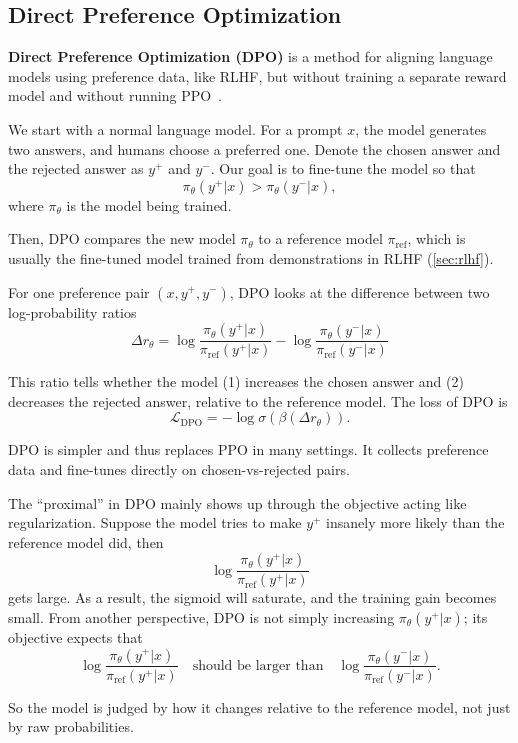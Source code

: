 \subsection{Direct Preference Optimization}

\textbf{Direct Preference Optimization (DPO)} is a method for aligning language models using preference data, like RLHF, but without training a separate reward model and without running PPO~\cite{rafailov2023direct}.

We start with a normal language model. For a prompt \(x\), the model generates two answers, and humans choose a preferred one. Denote the chosen answer and the rejected answer as \(y^+\) and \(y^-\). Our goal is to fine-tune the model so that
\[
	\pi_\theta (y^+ | x) > \pi_\theta (y^- | x),
\]
where \(\pi_\theta\) is the model being trained.

Then, DPO compares the new model \(\pi_\theta\) to a reference model \(\pi_\text{ref}\), which is usually the fine-tuned model trained from demonstrations in RLHF (\ref{sec:rlhf}).

For one preference pair \((x, y^+, y^-)\), DPO looks at the difference between two log-probability ratios
\[
	\Delta r_\theta =
	\log\frac{\pi_\theta(y^+|x)}{\pi_\text{ref}(y^+|x)} -
	\log\frac{\pi_\theta(y^-|x)}{\pi_\text{ref}(y^-|x)}
\]

This ratio tells whether the model (1) increases the chosen answer and (2) decreases the rejected answer, relative to the reference model. The loss of DPO is
\begin{equation}
	\mathcal{L}_\text{DPO} = - \log \sigma \left( \beta (\Delta r_\theta) \right).
\end{equation}

DPO is simpler and thus replaces PPO in many settings. It collects preference data and fine-tunes directly on chosen-vs-rejected pairs.

The “proximal” in DPO mainly shows up through the objective acting like regularization. Suppose the model tries to make \(y^+\) insanely more likely than the reference model did, then
\[
	\log\frac{\pi_\theta(y^+|x)}{\pi_\text{ref}(y^+|x)}
\]
gets large. As a result, the sigmoid will saturate, and the training gain becomes small. From another perspective, DPO is not simply increasing \(\pi_\theta (y^+|x)\); its objective expects that
\[
	\log\frac{\pi_\theta(y^+|x)}{\pi_\text{ref}(y^+|x)} \quad
	\text{should be larger than} \quad
	\log\frac{\pi_\theta(y^-|x)}{\pi_\text{ref}(y^-|x)}.
\]

So the model is judged by how it changes relative to the reference model, not just by raw probabilities.
